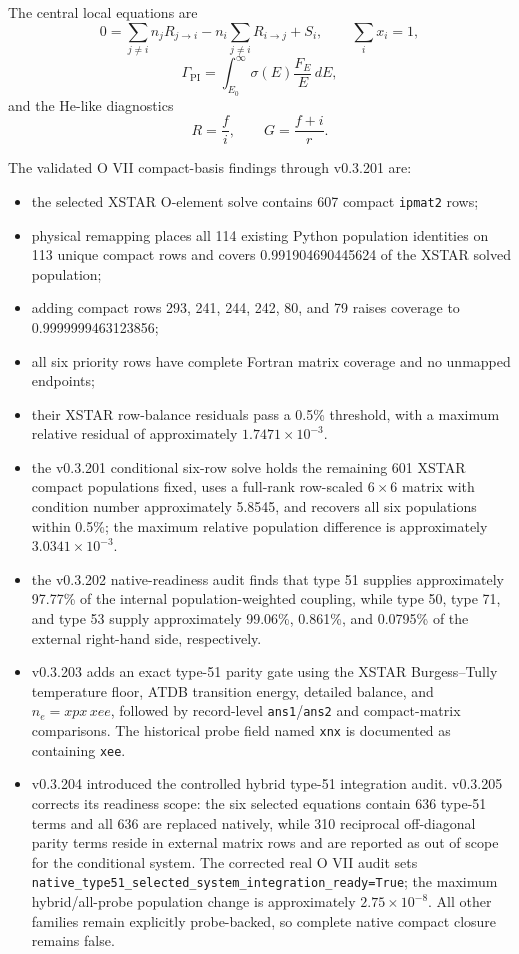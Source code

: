 \documentclass[11pt]{article}
\begin{document}
The central local equations are
\begin{equation}
0=\sum_{j\ne i} n_jR_{j\rightarrow i}-n_i\sum_{j\ne i}R_{i\rightarrow j}+S_i,
\qquad \sum_i x_i=1,
\end{equation}
\begin{equation}
\Gamma_{\mathrm{PI}}=\int_{E_0}^{\infty}\sigma(E)\frac{F_E}{E}\,dE,
\end{equation}
and the He-like diagnostics
\begin{equation}
R=\frac{f}{i}, \qquad G=\frac{f+i}{r}.
\end{equation}

The validated O VII compact-basis findings through v0.3.201 are:
\begin{itemize}
\item the selected XSTAR O-element solve contains 607 compact \texttt{ipmat2} rows;
\item physical remapping places all 114 existing Python population identities on 113 unique compact rows and covers 0.991904690445624 of the XSTAR solved population;
\item adding compact rows 293, 241, 244, 242, 80, and 79 raises coverage to 0.9999999463123856;
\item all six priority rows have complete Fortran matrix coverage and no unmapped endpoints;
\item their XSTAR row-balance residuals pass a 0.5\% threshold, with a maximum relative residual of approximately $1.7471\times10^{-3}$.
\item the v0.3.201 conditional six-row solve holds the remaining 601 XSTAR compact populations fixed, uses a full-rank row-scaled $6\times6$ matrix with condition number approximately 5.8545, and recovers all six populations within 0.5\%; the maximum relative population difference is approximately $3.0341\times10^{-3}$.
\item the v0.3.202 native-readiness audit finds that type 51 supplies approximately 97.77\% of the internal population-weighted coupling, while type 50, type 71, and type 53 supply approximately 99.06\%, 0.861\%, and 0.0795\% of the external right-hand side, respectively.
\item v0.3.203 adds an exact type-51 parity gate using the XSTAR Burgess--Tully temperature floor, ATDB transition energy, detailed balance, and $n_e=xpx\,xee$, followed by record-level \texttt{ans1}/\texttt{ans2} and compact-matrix comparisons. The historical probe field named \texttt{xnx} is documented as containing \texttt{xee}.
\item v0.3.204 introduced the controlled hybrid type-51 integration audit. v0.3.205 corrects its readiness scope: the six selected equations contain 636 type-51 terms and all 636 are replaced natively, while 310 reciprocal off-diagonal parity terms reside in external matrix rows and are reported as out of scope for the conditional system. The corrected real O VII audit sets \texttt{native\_type51\_selected\_system\_integration\_ready=True}; the maximum hybrid/all-probe population change is approximately $2.75\times10^{-8}$. All other families remain explicitly probe-backed, so complete native compact closure remains false.
\end{itemize}
\end{document}
